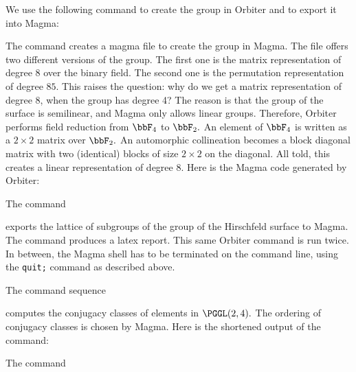 
We use the following command to create the group in Orbiter and to export it into Magma:



The command creates a magma file to create the group in Magma. 
The file offers two different versions of the group. 
The first one is the matrix representation of degree $8$ over the binary field. 
The second one is the permutation representation of degree $85$. This raises the question: why do we get a matrix representation of 
degree 8, when the group has degree 4? The reason is that the group of the surface is semilinear, and Magma only allows linear groups. 
Therefore, Orbiter performs field reduction from $\bbF_4$ to $\bbF_2.$ 
An element of $\bbF_4$ is written as a $2 \times 2$ matrix over $\bbF_2.$ 
An automorphic collineation becomes a block diagonal matrix with two (identical) blocks of size $2 \times 2$ on the diagonal.
All told, this creates a linear representation of degree $8$.
Here is the Magma code generated by Orbiter:




\bigskip


The command  


exports the lattice of subgroups of the group of the Hirschfeld surface to Magma. 
The command produces a latex report. This same Orbiter command is run twice. 
In between, the Magma shell has to be terminated on the command line, 
using the \verb'quit;' command as described above.


\bigskip



The command sequence  


computes the conjugacy classes of elements in $\PGGL(2,4).$
The ordering of conjugacy classes is chosen by Magma. Here is the shortened output of the command: 





\bigskip



The command  


